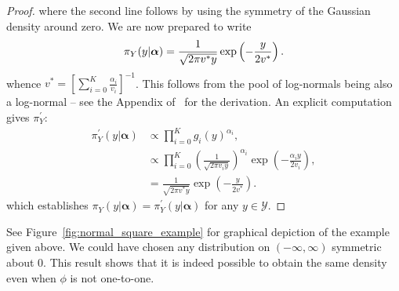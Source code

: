 \documentclass[a4paper, notitlepage, 10pt]{article}
\begin{document}
\begin{proof}
where the second line follows by using the symmetry of the Gaussian density around zero.
We are now prepared to write 
\begin{equation}
 \pi_Y(y |  \boldsymbol \alpha) = \frac{1}{\sqrt{2\pi v^\ast y}} \exp\left(-\frac{y}{2v^\ast}\right). \\
\end{equation}
whence $v^\ast =  \left[\sum_{i=0}^K \frac{\alpha_i}{v_i} \right]^{-1}$.
This follows from the pool of log-normals being also a log-normal -- see the Appendix of~\cite{Carvalho2019} for the derivation.
An explicit computation gives $\pi^{\prime}_{Y}$:
\begin{align}
 \pi^{\prime}_{Y}(y|  \boldsymbol \alpha) &\propto \prod_{i=0}^K g_i(y)^{\alpha_i}, \\
 & \propto \prod_{i=0}^K \left( \frac{1}{\sqrt{2\pi v_i y}} \right)^{\alpha_i} \exp\left(-\frac{\alpha_i y}{2v_i}\right),\\
 &= \frac{1}{\sqrt{2\pi v^\ast y}} \exp\left(-\frac{y}{2v^\ast}\right).
\end{align}
which establishes $ \pi_{Y}(y|  \boldsymbol \alpha) =  \pi^{\prime}_{Y}(y|  \boldsymbol \alpha)$ for any $ y \in \mathcal{Y}$.
\end{proof}
See Figure~\ref{fig:normal_square_example} for graphical depiction of the example given above.
We could have chosen any distribution on $(-\infty, \infty)$ symmetric about $0$.
This result shows that it is indeed possible to obtain the same density even when $\phi$ is not one-to-one.
\end{document}
